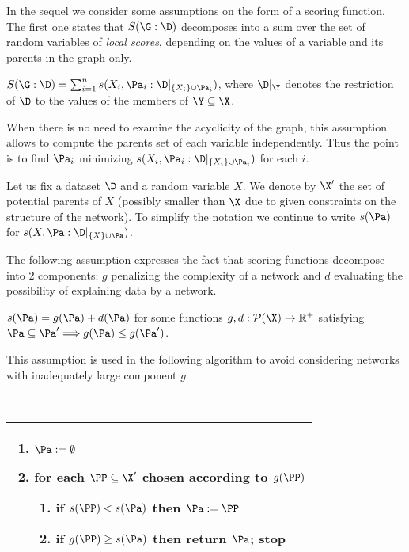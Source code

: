  In the sequel we consider some assumptions on the form of a scoring function.
 The first one states that $S(\G:\D)$ decomposes into a sum over the set of random variables of \emph{local scores}, depending on the values of a variable and its parents in the graph only.
 
\begin{ass}[additivity]\label{as1}
 $S(\G:\D) = \sum_{i=1}^n s(X_i,\Pa_i:\D|_{\{X_i\}\cup\Pa_i})$, where $\D|_{\Y}$ denotes the restriction of $\D$ to the values of the members of $\Y\subseteq\X$.
\end{ass}

 When there is no need to examine the acyclicity of the graph, this assumption allows to compute the parents set of each variable independently.
 Thus the point is to find $\Pa_i$ minimizing $s(X_i,\Pa_i:\D|_{\{X_i\}\cup\Pa_i})$ for each $i$.

 Let us fix a dataset $\D$ and a random variable $X$. 
 We denote by $\X'$ the set of potential parents of $X$ (possibly smaller than $\X$ due to given constraints on the structure of the network).
 To simplify the notation we continue to write $s(\Pa)$ for $s(X,\Pa:\D|_{\{X\}\cup\Pa})$.
 
 The following assumption expresses the fact that scoring functions decompose into 2 components: $g$ penalizing the complexity of a network and $d$ evaluating the possibility of explaining data by a network.

\begin{ass}[splitting]\label{as2}
 $s(\Pa)=g(\Pa)+d(\Pa)$ for some functions $g,d:\mathcal{P}(\X)\to\mathbb{R}^+$ satisfying $\Pa\subseteq\Pa'\Longrightarrow g(\Pa)\le g(\Pa')$.
\end{ass}

 This assumption is used in the following algorithm to avoid considering networks with inadequately large component $g$.

\begin{alg}\label{a1}~
\begin{center}
\begin{tabular}{|p{}|}\hline
\begin{enumerate}
\item $\Pa:=\emptyset$
\item for each $\PP\subseteq\X'$ chosen according to $g(\PP)$
\begin{enumerate}
\item if $s(\PP)<s(\Pa)$ then $\Pa:=\PP$
\item if $g(\PP)\ge s(\Pa)$ then return $\Pa$; stop
\end{enumerate}
\end{enumerate}\\
\hline
\end{tabular}
\end{center}
\end{alg}

